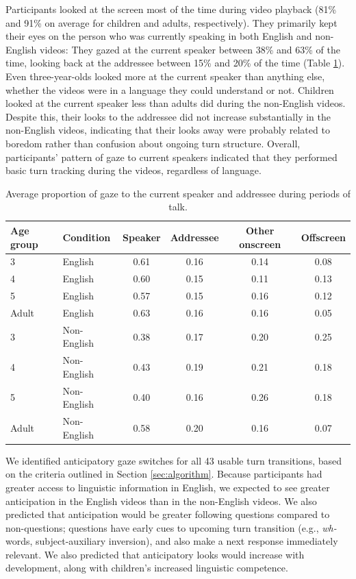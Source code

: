 \documentclass[authoryear, 12pt]{elsarticle}
\begin{document}
Participants looked at the screen most of the time during video playback (81\% and 91\% on average for children and adults, respectively). They primarily kept their eyes on the person who was currently speaking in both English and non-English videos: They gazed at the current speaker between 38\% and 63\% of the time, looking back at the addressee between 15\% and 20\% of the time (Table \ref{tab:e1_look}). Even three-year-olds looked more at the current speaker than anything else, whether the videos were in a language they could understand or not. Children looked at the current speaker less than adults did during the non-English videos. Despite this, their looks to the addressee did not increase substantially in the non-English videos, indicating that their looks away were probably related to boredom rather than confusion about ongoing turn structure. Overall, participants' pattern of gaze to current speakers indicated that they performed basic turn tracking during the videos, regardless of language.

\begin{table}[t]
\begin{center}
  \begin{tabular}{llcccc}
    \hline
    Age group & Condition & Speaker & Addressee & Other onscreen & Offscreen\\ 
    \hline
    3 & English & 0.61 & 0.16 & 0.14 & 0.08 \\ 
    4 & English & 0.60 & 0.15 & 0.11 & 0.13 \\ 
    5 & English & 0.57 & 0.15 & 0.16 & 0.12 \\ 
    Adult & English & 0.63 & 0.16 & 0.16 & 0.05 \\ 
    3 & Non-English & 0.38 & 0.17 & 0.20 & 0.25 \\ 
    4 & Non-English & 0.43 & 0.19 & 0.21 & 0.18 \\ 
    5 & Non-English & 0.40 & 0.16 & 0.26 & 0.18 \\ 
    Adult & Non-English & 0.58 & 0.20 & 0.16 & 0.07 \\ 
    \hline
  \end{tabular}
\end{center}
  \caption{Average proportion of gaze to the current speaker and addressee during periods of talk.}
\label{tab:e1_look}
\end{table}

We identified anticipatory gaze switches for all 43 usable turn transitions, based on the criteria outlined in Section \ref{sec:algorithm}. Because participants had greater access to linguistic information in English, we expected to see greater anticipation in the English videos than in the non-English videos. We also predicted that anticipation would be greater following questions compared to non-questions; questions have early cues to upcoming turn transition (e.g., \textit{wh-} words, subject-auxiliary inversion), and also make a next response immediately relevant. We also predicted that anticipatory looks would increase with development, along with children's increased linguistic competence.
\end{document}
